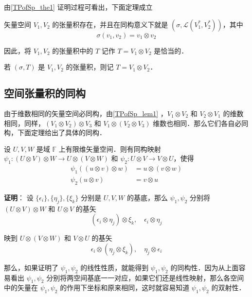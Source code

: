 由\autoref{TPofSp_the1} 证明过程可看出，下面定理成立
\begin{theorem}{}
矢量空间 $V_1,V_2$ 的张量积存在，并且在同构意义下就是 $(\sigma,\mathcal L(V_1^*,V_2^*))$，其中
\begin{equation}
\sigma(v_1,v_2)=v_1\otimes v_2
\end{equation}
\end{theorem}
 
 因此，将 $V_1,V_2$ 的张量积中的 $T$ 记作 $T=V_1\otimes V_2$ 是恰当的．

\begin{definition}{}
若 $(\sigma ,T)$ 是 $V_1,V_2$ 的张量积，则记 $T=V_1\otimes V_2$．
\end{definition}
\subsection{空间张量积的同构}
由于维数相同的矢量空间必同构，由\autoref{TPofSp_lem1} ，$V_1\otimes V_2$ 和 $V_2\otimes V_1$ 的维数相同，同样，$(V_1\otimes V_2)\otimes V_3$ 和 $V_1\otimes( V_2\otimes V_3)$ 维数也相同．那么它们各自必同构，下面定理给出了具体的同构．
\begin{theorem}{}\label{TPofSp_the2}
设 $U,V,W$ 是域 $\mathbb F$ 上有限维矢量空间．则有同构映射 $\psi_1:(U\otimes V)\otimes W\rightarrow U\otimes(V\otimes W)$ 和 $\psi_2:U\otimes V\rightarrow V\otimes U$，使得
\begin{equation}
\begin{aligned}
\psi_1((u\otimes v)\otimes w)&=u\otimes(v\otimes w)\\
\psi_2(u\otimes v)&=v\otimes u
\end{aligned}
\end{equation}
\end{theorem}
\textbf{证明}： 设 $\{\epsilon_i\},\{\eta_j\},\{\xi_k\}$ 分别是 $U,V,W$ 的基底，那么 $\psi_1,\psi_2$ 分别将 $(U\otimes V)\otimes W$ 和 $U\otimes V$ 的基矢
\begin{equation}
(\epsilon_i\otimes\eta_j)\otimes\xi_k,\quad \epsilon_i\otimes\eta_j
\end{equation}

映到 $U\otimes (V\otimes W)$ 和 $V\otimes U$ 的基矢 
\begin{equation}
\epsilon_i\otimes(\eta_j\otimes\xi_k),\quad \eta_j\otimes\epsilon_i
\end{equation}

那么，如果证明了 $\psi_1,\psi_2$ 的线性性质，就能得到 $\psi_1,\psi_2$ 的同构性．因为从上面容易看出 $\psi_1,\psi_2$ 分别将两空间基底一一对应，如果它们还是线性映射，那么各空间中的矢量在 $\psi_1,\psi_2$ 的作用下坐标和原来相同，这时就容易知道 $\psi_1,\psi_2$ 的双射性．

